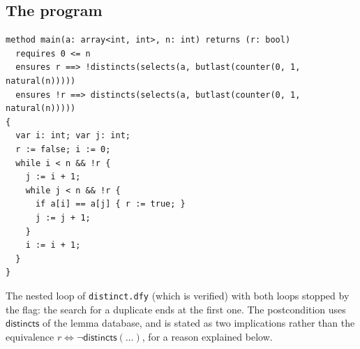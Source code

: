 \documentclass[11pt,a4paper]{article}
\begin{document}
\subsection{The program}
\begin{lstlisting}
method main(a: array<int, int>, n: int) returns (r: bool)
  requires 0 <= n
  ensures r ==> !distincts(selects(a, butlast(counter(0, 1, natural(n)))))
  ensures !r ==> distincts(selects(a, butlast(counter(0, 1, natural(n)))))
{
  var i: int; var j: int;
  r := false; i := 0;
  while i < n && !r {
    j := i + 1;
    while j < n && !r {
      if a[i] == a[j] { r := true; }
      j := j + 1;
    }
    i := i + 1;
  }
}
\end{lstlisting}
The nested loop of \texttt{distinct.dfy} (which is verified) with both loops stopped by the flag: the
search for a duplicate ends at the first one. The postcondition uses $\mathsf{distincts}$ of the lemma
database, and is stated as two implications rather than the equivalence $r \Leftrightarrow \neg\mathsf{distincts}(\ldots)$,
for a reason explained below.
\end{document}
